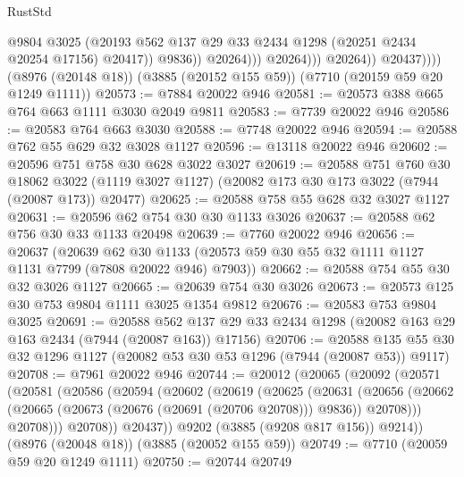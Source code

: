 \begin{lexlean}{RustStd}
\begin{coremodule}
                                  @9804
                                  @3025
                                  (@20193
                                    @562
                                    @137
                                    @29
                                    @33
                                    @2434
                                    @1298
                                    (@20251 @2434 @20254 @17156)
                                    @20417))
                                @9836))
                            @20264)))
                      @20264)))
                @20264))
            @20437))))
    (@8976 (@20148 @18))
    (@3885 (@20152 @155 @59))
    (@7710 (@20159 @59 @20 @1249 @1111))
@20573 := @7884 @20022 @946
@20581 := @20573 @388 @665 @764 @663 @1111 @3030 @2049 @9811
@20583 := @7739 @20022 @946
@20586 := @20583 @764 @663 @3030
@20588 := @7748 @20022 @946
@20594 := @20588 @762 @55 @629 @32 @3028 @1127
@20596 := @13118 @20022 @946
@20602 := @20596 @751 @758 @30 @628 @3022 @3027
@20619 := @20588
    @751
    @760
    @30
    @18062
    @3022
    (@1119 @3027 @1127)
    (@20082 @173 @30 @173 @3022 (@7944 (@20087 @173)) @20477)
@20625 := @20588 @758 @55 @628 @32 @3027 @1127
@20631 := @20596 @62 @754 @30 @30 @1133 @3026
@20637 := @20588 @62 @756 @30 @33 @1133 @20498
@20639 := @7760 @20022 @946
@20656 := @20637
    (@20639
      @62
      @30
      @1133
      (@20573 @59 @30 @55 @32 @1111 @1127 @1131 @7799 (@7808 @20022 @946) @7903))
@20662 := @20588 @754 @55 @30 @32 @3026 @1127
@20665 := @20639 @754 @30 @3026
@20673 := @20573 @125 @30 @753 @9804 @1111 @3025 @1354 @9812
@20676 := @20583 @753 @9804 @3025
@20691 := @20588
    @562
    @137
    @29
    @33
    @2434
    @1298
    (@20082 @163 @29 @163 @2434 (@7944 (@20087 @163)) @17156)
@20706 := @20588 @135 @55 @30 @32 @1296 @1127 (@20082 @53 @30 @53 @1296 (@7944 (@20087 @53)) @9117)
@20708 := @7961 @20022 @946
@20744 := @20012
    (@20065
      (@20092
        (@20571
          (@20581
            (@20586
              (@20594
                (@20602
                  (@20619
                    (@20625
                      (@20631
                        (@20656
                          (@20662
                            (@20665 (@20673 (@20676 (@20691 (@20706 @20708))) @9836))
                            @20708)))
                      @20708)))
                @20708))
            @20437))
        @9202
        (@3885 (@9208 @817 @156))
        @9214))
    (@8976 (@20048 @18))
    (@3885 (@20052 @155 @59))
@20749 := @7710 (@20059 @59 @20 @1249 @1111)
@20750 := @20744 @20749

\end{coremodule}
\end{lexlean}
